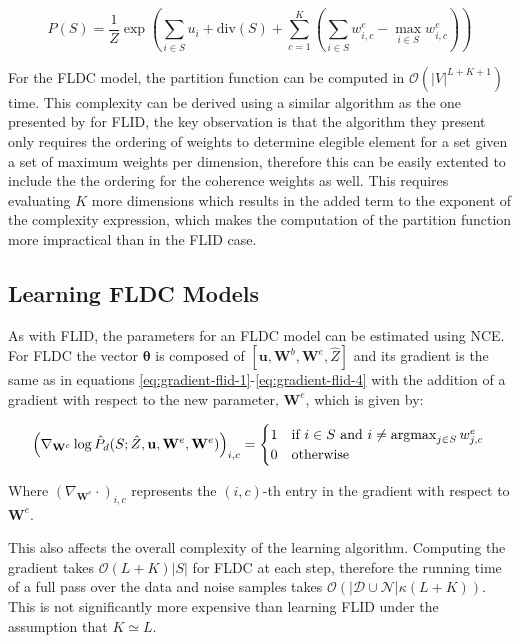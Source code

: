 \begin{equation}
  \tag{FLDC}
  P(S) = \frac{1}{Z}\exp{\left(\sum_{i \in S}{u_{i}} + \mathrm{div}(S) + \sum_{c=1}^{K}{\left(\sum_{i \in S}{w^{e}_{i,c}} - \max_{i \in S}{w^{e}_{i,c}}\right)}\right)}
  \label{eq:fldc}
\end{equation}

For the FLDC model, the partition function can be computed in $\mathcal{O}(|V|^{L+K+1})$ time. This complexity can be derived using a similar algorithm as the one presented by \citet{tschiatschek16learning} for FLID, the key observation is that the algorithm they present only requires the ordering of weights to determine elegible element for a set given a set of maximum weights per dimension, therefore this can be easily extented to include the the ordering for the coherence weights as well. This requires evaluating $K$ more dimensions which results in the added term to the exponent of the complexity expression, which makes the computation of the partition function more impractical than in the FLID case.

\subsection{Learning FLDC Models}

As with FLID, the parameters for an FLDC model can be estimated using NCE. For FLDC the vector $\boldsymbol{\theta}$ is composed of $[\mathbf{u}, \mathbf{W}^{b}, \mathbf{W}^{e}, \hat{Z}]$ and its gradient is the same as in equations \eqref{eq:gradient-flid-1}-\eqref{eq:gradient-flid-4} with the addition of a gradient with respect to the new parameter, $\mathbf{W}^{e}$, which is given by:

\begin{equation}
\left(\nabla_{\mathbf{W}^{e}}\log{\hat{P}_{d}(S; \hat{Z}, \mathbf{u}, \mathbf{W}^{e}, \mathbf{W}^{e})}\right)_{i,c} = \begin{cases}
1 & \text{if}\ i \in S\ \text{and}\ i \neq \operatorname*{argmax}_{j \in S}{w^{e}_{j,c}} \\
0 & \text{otherwise}
\end{cases} \label{eq:sub-fldc}\\
\end{equation}

Where $\left(\nabla_{\mathbf{W}^{e}}\cdot \right)_{i,c}$ represents the $(i,c)$-th entry in the gradient with respect to $\mathbf{W}^{e}$.

This also affects the overall complexity of the learning algorithm. Computing the gradient takes $\mathcal{O}(L+K)|S|$ for FLDC at each step, therefore the running time of a full pass over the data and noise samples takes $\mathcal{O}(|\mathcal{D}\cup\mathcal{N}|\kappa(L+K))$. This is not significantly more expensive than learning FLID under the assumption that $K \simeq L$.


